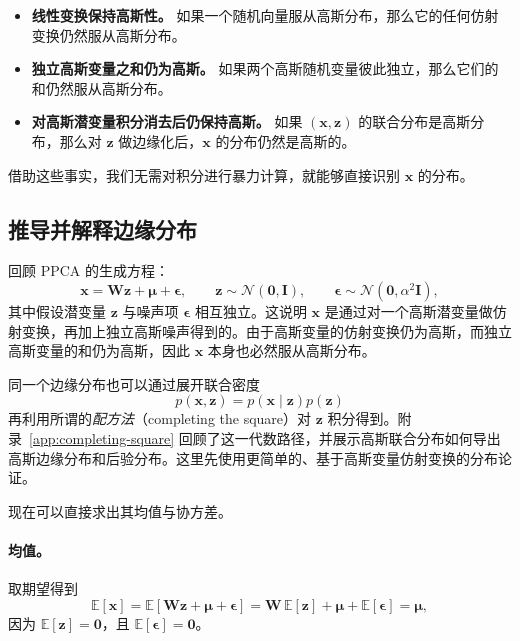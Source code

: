\begin{tcolorbox}[
  colback=blue!5!white,
  colframe=blue!75!black,
  title={为什么线性高斯模型易于解析处理？},
  boxrule=0.8pt,
  arc=2mm,
  left=2mm,
  right=2mm,
  top=1mm,
  bottom=1mm
]
\begin{itemize}
    \item \textbf{线性变换保持高斯性。}  
    如果一个随机向量服从高斯分布，那么它的任何仿射变换仍然服从高斯分布。

    \item \textbf{独立高斯变量之和仍为高斯。}  
    如果两个高斯随机变量彼此独立，那么它们的和仍然服从高斯分布。

    \item \textbf{对高斯潜变量积分消去后仍保持高斯。}  
    如果 \((\mathbf{x},\mathbf{z})\) 的联合分布是高斯分布，那么对 \(\mathbf{z}\) 做边缘化后，\(\mathbf{x}\) 的分布仍然是高斯的。
\end{itemize}
\end{tcolorbox}

借助这些事实，我们无需对积分进行暴力计算，就能够直接识别 \(\mathbf{x}\) 的分布。

\subsection{推导并解释边缘分布}

回顾 PPCA 的生成方程：
\[
\mathbf{x}=\mathbf{W}\mathbf{z}+\boldsymbol{\mu}+\boldsymbol{\epsilon},
\qquad
\mathbf{z}\sim\mathcal{N}(\mathbf{0},\mathbf{I}),
\qquad
\boldsymbol{\epsilon}\sim\mathcal{N}(\mathbf{0},\alpha^2\mathbf{I}),
\]
其中假设潜变量 \(\mathbf{z}\) 与噪声项 \(\boldsymbol{\epsilon}\) 相互独立。这说明 \(\mathbf{x}\) 是通过对一个高斯潜变量做仿射变换，再加上独立高斯噪声得到的。由于高斯变量的仿射变换仍为高斯，而独立高斯变量的和仍为高斯，因此 \(\mathbf{x}\) 本身也必然服从高斯分布。

同一个边缘分布也可以通过展开联合密度
\[
p(\mathbf{x},\mathbf{z})=p(\mathbf{x}\mid\mathbf{z})p(\mathbf{z})
\]
再利用所谓的\emph{配方法}（completing the square）对 \(\mathbf{z}\) 积分得到。附录~\ref{app:completing-square} 回顾了这一代数路径，并展示高斯联合分布如何导出高斯边缘分布和后验分布。这里先使用更简单的、基于高斯变量仿射变换的分布论证。

现在可以直接求出其均值与协方差。

\paragraph{均值。}
取期望得到
\[
\mathbb{E}[\mathbf{x}]
=
\mathbb{E}[\mathbf{W}\mathbf{z}+\boldsymbol{\mu}+\boldsymbol{\epsilon}]
=
\mathbf{W}\,\mathbb{E}[\mathbf{z}]+\boldsymbol{\mu}+\mathbb{E}[\boldsymbol{\epsilon}]
=
\boldsymbol{\mu},
\]
因为 \(\mathbb{E}[\mathbf{z}]=\mathbf{0}\)，且 \(\mathbb{E}[\boldsymbol{\epsilon}]=\mathbf{0}\)。

